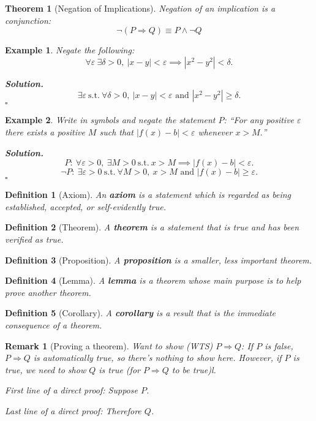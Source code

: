 \documentclass[12pt,a4paper]{article}
\newtheorem{thm}{Theorem}[subsection]
\newtheorem{df}{Definition}[subsection]
\newtheorem{eg}{Example}[subsection]
\newenvironment*{sol}{\par\indent\textbf{\textit{Solution. }}}{\hfill{$\square$}\par}
\newtheorem*{rmk}{\indent Remark}
\def\st{\ \mathrm{s.t.}\ }
\begin{document}
\begin{thm}[Negation of Implications]
	Negation of an implication is a conjunction:\[\neg(P\Rightarrow Q)\equiv P\wedge\neg Q\]	
\end{thm}
\begin{eg}
	Negate the following: \[\forall\varepsilon\ \exists\delta>0,\ |x-y|<\varepsilon\implies|x^2-y^2|<\delta.\]
	\begin{sol}
		\[\exists\varepsilon\st\forall\delta>0,\ |x-y|<\varepsilon\text{ and }|x^2-y^2|\geq\delta.\]
	\end{sol}
\end{eg}
\begin{eg}
	Write in symbols and negate the statement $P$: ``For any positive $\varepsilon$ there exists a positive $M$ such that $|f(x)-b|<\varepsilon$ whenever $x>M.$''	
	\begin{sol}
		\[P:\ \forall\varepsilon>0,\ \exists M>0\st x>M\implies|f(x)-b|<\varepsilon.\]\[\neg P:\ \exists\varepsilon>0\st\forall M>0,\ x>M\text{ and }|f(x)-b|\geq\varepsilon.\]	
	\end{sol}
\end{eg}
\begin{df}[Axiom]
	An \textbf{axiom} is a statement which is regarded as being established, accepted, or self-evidently true.
\end{df}
\begin{df}[Theorem]
	A \textbf{theorem} is a statement that is true and has been verified as true.	
\end{df}
\begin{df}[Proposition]
	A \textbf{proposition} is a smaller, less important theorem.	
\end{df}
\begin{df}[Lemma]
	A \textbf{lemma} is a theorem whose main purpose is to help prove another theorem.	
\end{df}
\begin{df}[Corollary]
	A \textbf{corollary} is a result that is the immediate consequence of a theorem. 	
\end{df}
\begin{rmk}[Proving a theorem]
	Want to show (WTS) $P\Rightarrow Q$: If	$P$ is false, $P\Rightarrow Q$ is automatically true, so there's nothing to show here. However, if $P$ is true, we need to show $Q$ is true (for $P\Rightarrow Q$ to be true)l.
	
	First line of a direct proof: Suppose $P$.
	
	Last line of a direct proof: Therefore $Q$.
\end{rmk}
\end{document}
